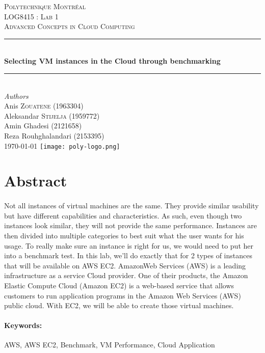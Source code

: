 \documentclass[12pt]{article}
\begin{document}
\begin{titlepage} 
	\newcommand{\HRule}{\rule{\linewidth}{0.5mm}}
	\center
	\textsc{\LARGE Polytechnique Montréal}\\[1.5cm]
	\textsc{\Large LOG8415 : Lab 1}\\[0.5cm]
	\textsc{\large Advanced Concepts in Cloud Computing}\\[0.5cm]
	\HRule\\[0.4cm]
	{\huge\bfseries Selecting VM instances in the Cloud through
	benchmarking}\\[0.4cm]
	\HRule\\[1.5cm]
	{\large\textit{Authors}}\\
	Anis \textsc{Zouatene} (1963304)\\
	Aleksandar \textsc{Stijelja} (1959772)\\
	Amin Ghadesi\textsc{} (2121658)\\
    Reza Rouhghalandari \textsc{} (2153395)\\
	\vfill\vfill\vfill {\large\today} \vfill\vfill
	\texttt{[image: poly-logo.png]}\\[1cm]
	\vfill
\end{titlepage}


\section{Abstract}
	\paragraph{} Not all instances of virtual machines are the same. 
    They provide similar usability but have different capabilities 
    and characteristics. As such, even though two instances look similar, 
    they will not provide the same performance. Instances are then divided 
    into multiple categories to best suit what the user wants for his usage. 
    To really make sure an instance is right for us, we would need to put her 
    into a benchmark test. In this lab, we’ll do exactly that for 2 types of 
    instances that will be available on AWS EC2. AmazonWeb Services (AWS) is 
    a leading infrastructure as a service Cloud provider. One of their products, 
    the Amazon Elastic Compute Cloud (Amazon EC2) is a web-based service that 
    allows customers to run application programs in the Amazon Web Services (AWS) 
    public cloud. With EC2, we will be able to create those virtual machines.

	\paragraph{Keywords:}AWS, AWS EC2, Benchmark, VM Performance, Cloud Application
	\pagebreak
\end{document}
